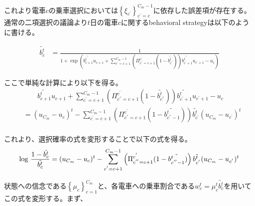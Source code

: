 \documentclass{jsarticle}
\begin{document}
これより電車$c$の乗車選択においては$\left\{ \xi_{c^{'}} \right\}_{c^{'} = c}^{C_m-1}$に依存した誤差項が存在する。通常の二項選択の議論より$t$日の電車$c$に関するbehavioral strategyは以下のように書ける。

\begin{align*}
	\tilde{b_c^t} &= \frac{1}{1 + \exp \left(\tilde{b_{c+1}^t} u_{c+1} + \sum_{c^{'}=c+1}^{C_m-1} \left( \Pi_{c^{''} = c+1}^{c^{'}} (1 - \tilde{b_{c^{''}}^t}) \right) \tilde{b_{c^{'} + 1}^t} u_{c^{'} + 1} - u_c \right)}
\end{align*}

ここで単純な計算により以下を得る。
\begin{align*}
	&\qquad \tilde{b_{c+1}^t} u_{c+1} + \sum_{c^{'}=c+1}^{C_m-1} \left( \Pi_{c^{''} = c+1}^{c^{'}} (1 - \tilde{b_{c^{''}}^t}) \right) \tilde{b_{c^{'} + 1}^t} u_{c^{'} + 1} - u_c\\[8pt]
	&= (u_{C_m} - u_c)^t - \sum_{c^{'} = c+1}^{C_m - 1} \left( \Pi_{c^{''} = c+1}^{c^{'}} (1 - \tilde{b_{c^{''} - 1}^t}) \right) \tilde{b_{c^{'}}^t} (u_{C_m} - u_{c^{'}})^t\\[8pt]
\end{align*}

これより、選択確率の式を変形することで以下の式を得る。
\begin{align}
	{\rm log}\ \frac{1 - \tilde{{b_c^t}}}{\tilde{b_c^t}} = (u_{C_m} - u_c)^t - \sum_{c^{'} = c+1}^{C_m - 1} \left( \Pi_{c^{''} = c+1}^{c^{'}} (1 - \tilde{b_{c^{''} - 1}^t}) \right) \tilde{b_{c^{'}}^t} (u_{C_m} - u_{c^{'}})^t
\end{align}

状態への信念である$\left\{ \mu_c \right\}_{c = 1}^{C_m}$と、各電車への乗車割合である$w_c^t = \mu_c^t \tilde{b_c^t}$を用いてこの式を変形する。まず、
\end{document}
